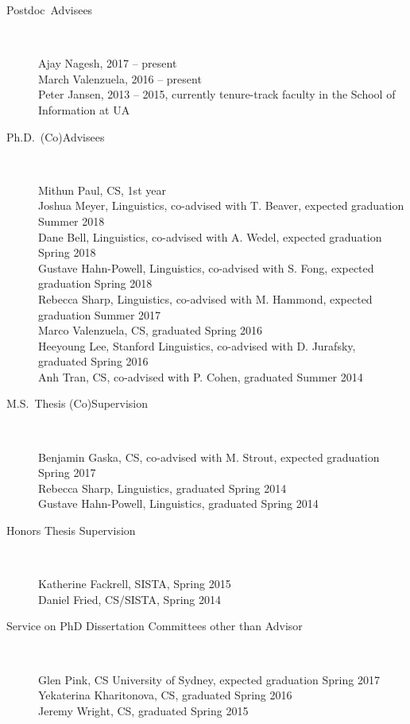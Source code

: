 \documentclass[10pt]{article}
\begin{document}
\begin{description}
\vspace{-.1cm}\item [Postdoc~Advisees]\

Ajay Nagesh, 2017 -- present\\
March Valenzuela, 2016 -- present\\
Peter Jansen, 2013 -- 2015, currently tenure-track faculty in the School of Information at UA

\vspace{-.1cm}\item [Ph.D.~(Co)Advisees]\

Mithun Paul, CS, 1st year \\
Joshua Meyer, Linguistics, co-advised with T. Beaver, expected graduation Summer 2018 \\
Dane Bell, Linguistics, co-advised with A. Wedel, expected graduation Spring 2018 \\
Gustave Hahn-Powell, Linguistics, co-advised with S. Fong, expected graduation Spring 2018 \\
Rebecca Sharp, Linguistics, co-advised with M. Hammond, expected graduation Summer 2017 \\
Marco Valenzuela, CS, graduated Spring 2016 \\
Heeyoung Lee, Stanford Linguistics, co-advised with D. Jurafsky, graduated Spring 2016 \\
Anh Tran, CS, co-advised with P. Cohen, graduated Summer 2014

\vspace{-.1cm}\item [M.S.~Thesis (Co)Supervision ]\

Benjamin Gaska, CS, co-advised with M. Strout, expected graduation Spring 2017\\
Rebecca Sharp, Linguistics, graduated Spring 2014 \\
Gustave Hahn-Powell, Linguistics, graduated Spring 2014 

\vspace{-.1cm}\item [Honors Thesis Supervision ]\

Katherine Fackrell, SISTA, Spring 2015 \\
Daniel Fried, CS/SISTA, Spring 2014

\vspace{-.1cm}\item [Service on PhD Dissertation Committees other than Advisor ]\

Glen Pink, CS University of Sydney, expected graduation Spring 2017 \\
Yekaterina Kharitonova, CS, graduated Spring 2016 \\
Jeremy Wright, CS, graduated Spring 2015 


\end{description}
\end{document}
